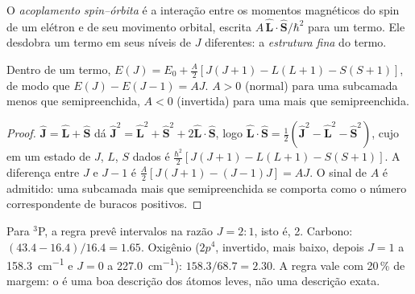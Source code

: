 \begin{definition}\label{def:b3:many-electron-atoms:spin-orbit}
O \emph{acoplamento spin--órbita} é a interação
entre os momentos magnéticos do spin de um elétron e de seu movimento
orbital, escrita $A\,\hat{\mathbf L}\cdot\hat{\mathbf S}/\hbar^2$ para um termo. Ele
desdobra um termo em seus níveis de $J$ diferentes: a \emph{estrutura
fina} do termo.
\end{definition}

\begin{proposition}\label{prop:b3:many-electron-atoms:lande}
Dentro de um termo, $E(J) = E_0 + \frac{A}{2}[J(J+1) - L(L+1) - S(S+1)]$, de modo que
$E(J) - E(J - 1) = AJ$. $A > 0$ (normal) para uma subcamada menos que
semipreenchida, $A < 0$ (invertida) para uma mais que semipreenchida.
\end{proposition}

\begin{proof}
$\hat{\mathbf J} = \hat{\mathbf L} + \hat{\mathbf S}$ dá $\hat{\mathbf J}^2 =
\hat{\mathbf L}^2 + \hat{\mathbf S}^2 + 2\hat{\mathbf L}\cdot\hat{\mathbf S}$, logo
$\hat{\mathbf L}\cdot\hat{\mathbf S} = \frac12(\hat{\mathbf J}^2 - \hat{\mathbf L}^2 -
\hat{\mathbf S}^2)$, cujo  em um estado de $J$, $L$, $S$ dados é
$\frac{\hbar^2}{2}[J(J+1) - L(L+1) - S(S+1)]$. A diferença entre $J$ e
$J - 1$ é $\frac A2[J(J+1) - (J-1)J] = AJ$. O sinal de $A$ é admitido: uma
subcamada mais que semipreenchida se comporta como o número correspondente
de buracos positivos.
\end{proof}

\begin{example}\label{ex:b3:many-electron-atoms:lande-test}
Para ${}^3$P, a regra prevê intervalos na razão $J = 2 : 1$, isto é, 2.
Carbono: $(43.4 - 16.4)/16.4 = 1.65$. Oxigênio ($2p^4$, invertido, 
mais baixo, depois $J = 1$ a \qty{158.3}{cm^{-1}} e $J = 0$ a \qty{227.0}{cm^{-1}}):
$158.3/68.7 = 2.30$. A regra vale com 20\,\% de margem: o  é uma boa descrição dos átomos leves, não uma descrição exata.
\end{example}

